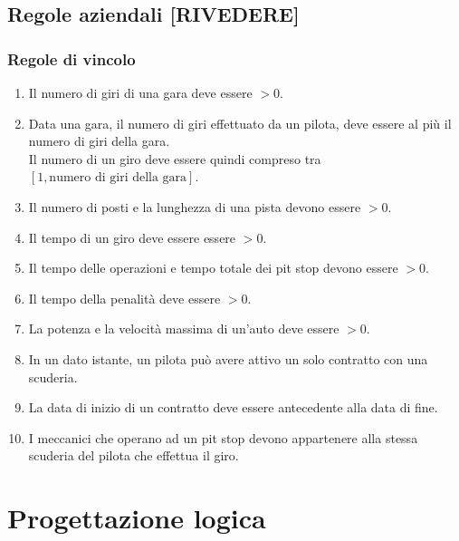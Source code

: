 \documentclass[11pt]{article}
\begin{document}
\subsection{Regole aziendali [RIVEDERE]}
\subsubsection{Regole di vincolo}
\begin{enumerate}[label={RV \arabic*}, leftmargin=4em]
    \item Il numero di giri di una gara deve essere $>0$.
    \item Data una gara, il numero di giri effettuato da un pilota, deve essere al più il numero di giri della gara.\\
          Il numero di un giro deve essere quindi compreso tra $[1, \text{numero di giri della gara}]$.
    \item Il numero di posti e la lunghezza di una pista devono essere $>0$. 
    \item Il tempo di un giro deve essere essere $>0$. 
    \item Il tempo delle operazioni e tempo totale dei pit stop devono essere $>0$.
    \item Il tempo della penalità deve essere $>0$.
    \item La potenza e la velocità massima di un'auto deve essere $>0$.
    \item In un dato istante, un pilota può avere attivo un solo contratto con una scuderia.
    \item La data di inizio di un contratto deve essere antecedente alla data di fine.
    \item I meccanici che operano ad un pit stop devono appartenere alla stessa scuderia del pilota che effettua il giro.
\end{enumerate}


\section{Progettazione logica}
\end{document}
